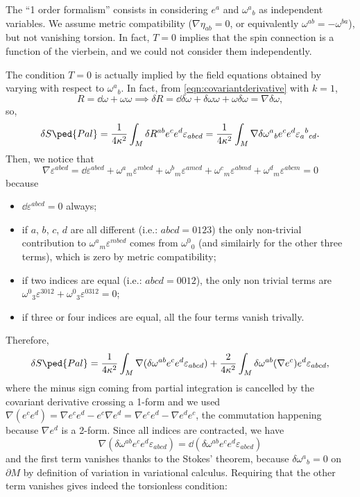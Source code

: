 \documentclass[a4paper,12pt]{book}
\begin{document}
The ``1 order formalism'' consists in considering $e^a$ and $\omega^a{}_b$ as independent variables. We assume metric compatibility ($\nabla\eta_{ab}=0$, or equivalently $\omega^{ab}=-\omega^{ba}$), but not vanishing torsion. In fact, $T=0$ implies that the spin connection is a function of the vierbein, and we could not consider them independently.

The condition $T=0$ is actually implied by the field equations obtained by varying with respect to $\omega^a{}_b$. In fact, from \cref{eqn:covariantderivative} with $k=1$,
\[R=\dd\omega+\omega\omega\implies\delta R=\dd\delta\omega+\delta\omega\omega+\omega\delta\omega=\nabla\delta\omega,\]
so,
\[
\delta S\ped{Pal}=\frac{1}{4\kappa^2}\int_M\delta R^{ab}e^ce^d\varepsilon_{abcd}=\frac{1}{4\kappa^2}\int_M\nabla\delta\omega^a{}_be^ce^d\varepsilon_a{}^b{}_{cd}.
\]
Then, we notice that
\[\nabla\varepsilon^{abcd}=\dd\varepsilon^{abcd}+\omega^a{}_m\varepsilon^{mbcd}+\omega^b{}_m\varepsilon^{amcd}+\omega^c{}_m\varepsilon^{abmd}+\omega^d{}_m\varepsilon^{abcm}=0\]
because
\begin{itemize}
\item $\dd\varepsilon^{abcd}=0$ always;
\item if $a$, $b$, $c$, $d$ are all different (i.e.: $abcd=0123$) the only non-trivial contribution to $\omega^a{}_m\varepsilon^{mbcd}$ comes from $\omega^0{}_0$ (and similairly for the other three terms), which is zero by metric compatibility;
\item if two indices are equal (i.e.: $abcd=0012$), the only non trivial terms are $\omega^0{}_3\varepsilon^{3012}+\omega^0{}_3\varepsilon^{0312}=0$;
\item if three or four indices are equal, all the four terms vanish trivally.
\end{itemize}
Therefore,
\[\delta S\ped{Pal}=\frac{1}{4\kappa^2}\int_M\nabla(\delta\omega^{ab}e^ce^d\varepsilon_{abcd})+\frac{2}{4\kappa^2}\int_M\delta\omega^{ab}(\nabla e^c)e^d\varepsilon_{abcd},\]
where the minus sign coming from partial integration is cancelled by the covariant derivative crossing a 1-form and we used $\nabla(e^ce^d)=\nabla e^ce^d-e^c\nabla e^d=\nabla e^ce^d-\nabla e^de^c$, the commutation happening because $\nabla e^d$ is a 2-form. Since all indices are contracted, we have
\[\nabla(\delta\omega^{ab}e^ce^d\varepsilon_{abcd})=\dd(\delta\omega^{ab}e^ce^d\varepsilon_{abcd})\]
and the first term vanishes thanks to the Stokes' theorem, because $\delta\omega^a{}_b=0$ on $\partial M$ by definition of variation in variational calculus. Requiring that the other term vanishes gives indeed the torsionless condition:
\end{document}
